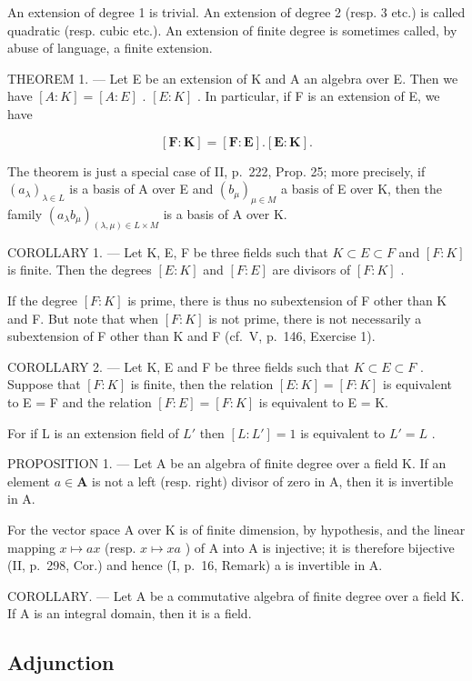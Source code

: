 An extension of degree 1 is trivial. An extension of degree 2 (resp. 3 etc.) is called quadratic (resp. cubic etc.). An extension of finite degree is sometimes called, by abuse of language, a finite extension.

THEOREM 1. --- Let E be an extension of K and A an algebra over E. Then we have \([A:K]=[A:E]\) . \([E:K]\) . In particular, if F is an extension of E, we have

\[
[ \mathbf {F}: \mathbf {K} ] = [ \mathbf {F}: \mathbf {E} ]. [ \mathbf {E}: \mathbf {K} ].\tag{1}
\]

The theorem is just a special case of II, p.~222, Prop. 25; more precisely, if \((a_{\lambda})_{\lambda \in L}\) is a basis of A over E and \((b_{\mu})_{\mu \in M}\) a basis of E over K, then the family \((a_{\lambda}b_{\mu})_{(\lambda ,\mu)\in L\times M}\) is a basis of A over K.

COROLLARY 1. --- Let K, E, F be three fields such that \(K \subset E \subset F\) and \([F:K]\) is finite. Then the degrees \([E:K]\) and \([F:E]\) are divisors of \([F:K]\) .

If the degree \([F:K]\) is prime, there is thus no subextension of F other than K and F. But note that when \([F:K]\) is not prime, there is not necessarily a subextension of F other than K and F (cf.~V, p.~146, Exercise 1).

COROLLARY 2. --- Let K, E and F be three fields such that \(K \subset E \subset F\) . Suppose that \([F:K]\) is finite, then the relation \([E:K] = [F:K]\) is equivalent to E = F and the relation \([F:E] = [F:K]\) is equivalent to E = K.

For if L is an extension field of \(L'\) then \([L:L'] = 1\) is equivalent to \(L' = L\) .

PROPOSITION 1. --- Let A be an algebra of finite degree over a field K. If an element \(a \in \mathbf{A}\) is not a left (resp. right) divisor of zero in A, then it is invertible in A.

For the vector space A over K is of finite dimension, by hypothesis, and the linear mapping \(x \mapsto ax\) (resp. \(x \mapsto xa\) ) of A into A is injective; it is therefore bijective (II, p.~298, Cor.) and hence (I, p.~16, Remark) a is invertible in A.

COROLLARY. --- Let A be a commutative algebra of finite degree over a field K. If A is an integral domain, then it is a field.

\subsection{Adjunction}

